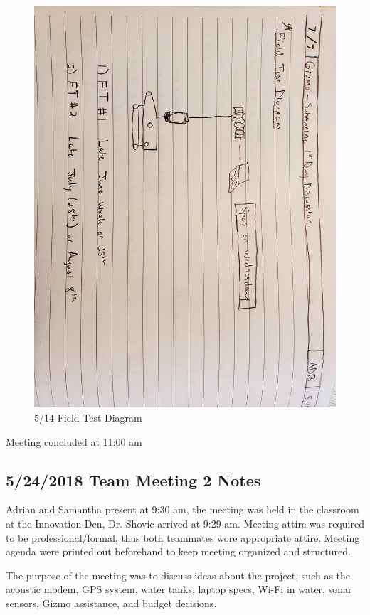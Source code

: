 \documentclass[12pt]{article}
\begin{document}
\begin{itemize}
\begin{figure}[!htb]
					\includegraphics[width=130mm]{assets/Field_Test_Diagram.jpg}
					\caption{5/14 Field Test Diagram \label{overflow}}
				\end{figure}
			\end{itemize}
		
			\noindent
			Meeting concluded at 11:00 am
			
		\subsection{5/24/2018 Team Meeting 2 Notes}
		
		\noindent
		Adrian and Samantha present at 9:30 am, the meeting was held in the classroom at the Innovation Den, Dr. Shovic arrived at 9:29 am. Meeting attire was required to be professional/formal, thus both teammates wore appropriate attire. Meeting agenda were printed out beforehand to keep meeting organized and structured.
		
		\noindent
		The purpose of the meeting was to discuss ideas about the project, such as the acoustic modem, GPS system, water tanks, laptop specs, Wi-Fi in water, sonar sensors, Gizmo assistance, and budget decisions.
		
\end{document}

